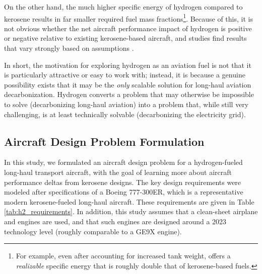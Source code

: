 On the other hand, the much higher specific energy of hydrogen compared to kerosene results in far smaller required fuel mass fractions\footnote{For example, even after accounting for increased tank weight, \lh offers a \emph{realizable} specific energy that is roughly double that of kerosene-based fuels.}. Because of this, it is not obvious whether the net aircraft performance impact of hydrogen is positive or negative relative to existing kerosene-based aircraft, and studies find results that vary strongly based on assumptions \cite{cascade, gaubatz_estimating_2023, tiwari_review_2024}.

In short, the motivation for exploring hydrogen as an aviation fuel is not that it is particularly attractive or easy to work with; instead, it is because a genuine possibility exists that it may be the \emph{only} scalable solution for long-haul aviation decarbonization. Hydrogen converts a problem that may otherwise be impossible to solve (decarbonizing long-haul aviation) into a problem that, while still very challenging, is at least technically solvable (decarbonizing the electricity grid).

\subsection{Aircraft Design Problem Formulation}

In this study, we formulated an aircraft design problem for a hydrogen-fueled long-haul transport aircraft, with the goal of learning more about aircraft performance deltas from kerosene designs. The key design requirements were modeled after specifications of a Boeing 777-300ER, which is a representative modern kerosene-fueled long-haul aircraft. These requirements are given in Table \ref{tab:h2_requirements}. In addition, this study assumes that a clean-sheet airplane and engines are used, and that such engines are designed around a 2023 technology level (roughly comparable to a GE9X engine).


